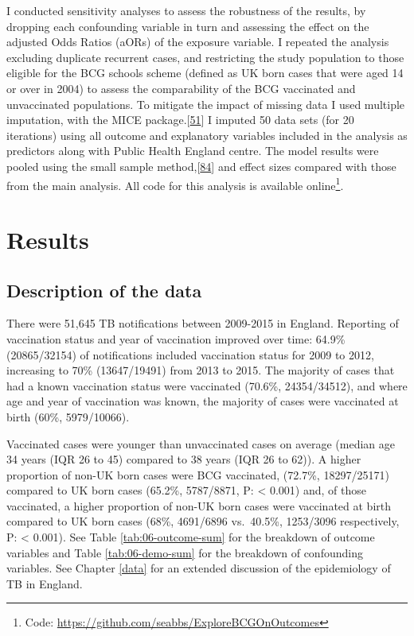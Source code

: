 \documentclass[11pt,twoside]{bristolthesis}
\begin{document}
  I conducted sensitivity analyses to assess the robustness of the results, by dropping each confounding variable in turn and assessing the effect on the adjusted Odds Ratios (aORs) of the exposure variable. I repeated the analysis excluding duplicate recurrent cases, and restricting the study population to those eligible for the BCG schools scheme (defined as UK born cases that were aged 14 or over in 2004) to assess the comparability of the BCG vaccinated and unvaccinated populations. To mitigate the impact of missing data I used multiple imputation, with the MICE package.{[}\protect\hyperlink{ref-Groothuis-oudshoorn}{51}{]} I imputed 50 data sets (for 20 iterations) using all outcome and explanatory variables included in the analysis as predictors along with Public Health England centre. The model results were pooled using the small sample method,{[}\protect\hyperlink{ref-Barnard1999}{84}{]} and effect sizes compared with those from the main analysis. All code for this analysis is available online\footnote{Code: \url{https://github.com/seabbs/ExploreBCGOnOutcomes}}.
  
  \hypertarget{results-1}{%
  \section{Results}\label{results-1}}
  
  \hypertarget{description-of-the-data}{%
  \subsection{Description of the data}\label{description-of-the-data}}
  
  There were 51,645 TB notifications between 2009-2015 in England. Reporting of vaccination status and year of vaccination improved over time: 64.9\% (20865/32154) of notifications included vaccination status for 2009 to 2012, increasing to 70\% (13647/19491) from 2013 to 2015. The majority of cases that had a known vaccination status were vaccinated (70.6\%, 24354/34512), and where age and year of vaccination was known, the majority of cases were vaccinated at birth (60\%, 5979/10066).
  
  Vaccinated cases were younger than unvaccinated cases on average (median age 34 years (IQR 26 to 45) compared to 38 years (IQR 26 to 62)). A higher proportion of non-UK born cases were BCG vaccinated, (72.7\%, 18297/25171) compared to UK born cases (65.2\%, 5787/8871, P: \textless{} 0.001) and, of those vaccinated, a higher proportion of non-UK born cases were vaccinated at birth compared to UK born cases (68\%, 4691/6896 vs.~40.5\%, 1253/3096 respectively, P: \textless{} 0.001). See Table \ref{tab:06-outcome-sum} for the breakdown of outcome variables and Table \ref{tab:06-demo-sum} for the breakdown of confounding variables. See Chapter \ref{data} for an extended discussion of the epidemiology of TB in England.
  
\end{document}
